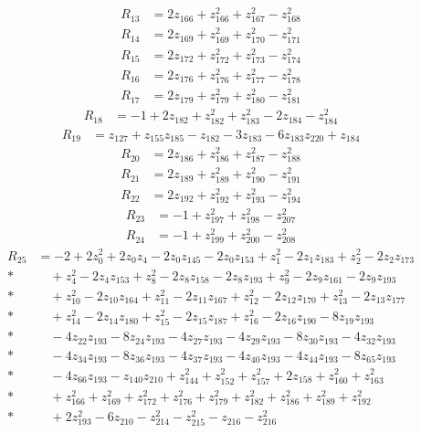 \documentclass[11pt]{article}
\theoremstyle{remark}
\begin{document}
\begin{align*}
R_{13}&=2z_{166}+z_{166}^{2}+z_{167}^{2}-z_{168}^{2}
\end{align*}
\begin{align*}
R_{14}&=2z_{169}+z_{169}^{2}+z_{170}^{2}-z_{171}^{2}
\end{align*}
\begin{align*}
R_{15}&=2z_{172}+z_{172}^{2}+z_{173}^{2}-z_{174}^{2}
\end{align*}
\begin{align*}
R_{16}&=2z_{176}+z_{176}^{2}+z_{177}^{2}-z_{178}^{2}
\end{align*}
\begin{align*}
R_{17}&=2z_{179}+z_{179}^{2}+z_{180}^{2}-z_{181}^{2}
\end{align*}
\begin{align*}
R_{18}&=-1+2z_{182}+z_{182}^{2}+z_{183}^{2}-2z_{184}-z_{184}^{2}
\end{align*}
\begin{align*}
R_{19}&=z_{127}+z_{155} z_{185}-z_{182}-3z_{183}-6z_{183} z_{220}+z_{184}
\end{align*}
\begin{align*}
R_{20}&=2z_{186}+z_{186}^{2}+z_{187}^{2}-z_{188}^{2}
\end{align*}
\begin{align*}
R_{21}&=2z_{189}+z_{189}^{2}+z_{190}^{2}-z_{191}^{2}
\end{align*}
\begin{align*}
R_{22}&=2z_{192}+z_{192}^{2}+z_{193}^{2}-z_{194}^{2}
\end{align*}
\begin{align*}
R_{23}&=-1+z_{197}^{2}+z_{198}^{2}-z_{207}^{2}
\end{align*}
\begin{align*}
R_{24}&=-1+z_{199}^{2}+z_{200}^{2}-z_{208}^{2}
\end{align*}
\begin{align*}
R_{25}&=-2+2z_{0}^{2}+2z_{0} z_{4}-2z_{0} z_{145}-2z_{0} z_{153}+z_{1}^{2}-2z_{1} z_{183}+z_{2}^{2}-2z_{2} z_{173}\\*
&\quad{}+z_{4}^{2}-2z_{4} z_{153}+z_{8}^{2}-2z_{8} z_{158}-2z_{8} z_{193}+z_{9}^{2}-2z_{9} z_{161}-2z_{9} z_{193}\\*
&\quad{}+z_{10}^{2}-2z_{10} z_{164}+z_{11}^{2}-2z_{11} z_{167}+z_{12}^{2}-2z_{12} z_{170}+z_{13}^{2}-2z_{13} z_{177}\\*
&\quad{}+z_{14}^{2}-2z_{14} z_{180}+z_{15}^{2}-2z_{15} z_{187}+z_{16}^{2}-2z_{16} z_{190}-8z_{19} z_{193}\\*
&\quad{}-4z_{22} z_{193}-8z_{24} z_{193}-4z_{27} z_{193}-4z_{29} z_{193}-8z_{30} z_{193}-4z_{32} z_{193}\\*
&\quad{}-4z_{34} z_{193}-8z_{36} z_{193}-4z_{37} z_{193}-4z_{40} z_{193}-4z_{44} z_{193}-8z_{65} z_{193}\\*
&\quad{}-4z_{66} z_{193}-z_{140} z_{210}+z_{144}^{2}+z_{152}^{2}+z_{157}^{2}+2z_{158}+z_{160}^{2}+z_{163}^{2}\\*
&\quad{}+z_{166}^{2}+z_{169}^{2}+z_{172}^{2}+z_{176}^{2}+z_{179}^{2}+z_{182}^{2}+z_{186}^{2}+z_{189}^{2}+z_{192}^{2}\\*
&\quad{}+2z_{193}^{2}-6z_{210}-z_{214}^{2}-z_{215}^{2}-z_{216}-z_{216}^{2}
\end{align*}
\end{document}
